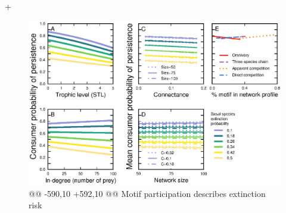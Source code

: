 +        %
     \begin{figure}[ht!]
         \centering
         \includegraphics[width=\textwidth]{figures/persistence_vs_SC_lm.eps}
@@ -590,10 +592,10 @@ Motif participation describes extinction risk
 

\end{figure}
